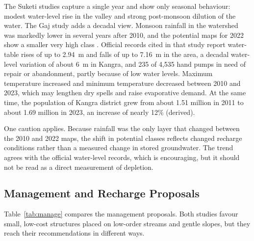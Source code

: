 \documentclass[10pt,a4paper,twocolumn]{article}
\begin{document}
The Suketi studies capture a single year and show only seasonal behaviour: modest water-level
rise in the valley and strong post-monsoon dilution of the water. The Gaj study adds a decadal
view. Monsoon rainfall in the watershed was markedly lower in several years after 2010, and the
potential maps for 2022 show a smaller very high class \citep{sharma2025}. Official records cited
in that study report water-table rises of up to 2.94~m and falls of up to 7.16~m in the area, a
decadal water-level variation of about 6~m in Kangra, and 235 of 4,535 hand pumps in need of
repair or abandonment, partly because of low water levels. Maximum temperature increased and
minimum temperature decreased between 2010 and 2023, which may lengthen dry spells and raise
evaporative demand. At the same time, the population of Kangra district grew from about 1.51
million in 2011 to about 1.69 million in 2023, an increase of nearly 12\% (derived).

One caution applies. Because rainfall was the only layer that changed between the 2010 and
2022 maps, the shift in potential classes reflects changed recharge conditions rather than a
measured change in stored groundwater. The trend agrees with the official water-level records,
which is encouraging, but it should not be read as a direct measurement of depletion.

\subsection{Management and Recharge Proposals}

Table~\ref{tab:manage} compares the management proposals. Both studies favour small, low-cost
structures placed on low-order streams and gentle slopes, but they reach their recommendations
in different ways.
\end{document}
